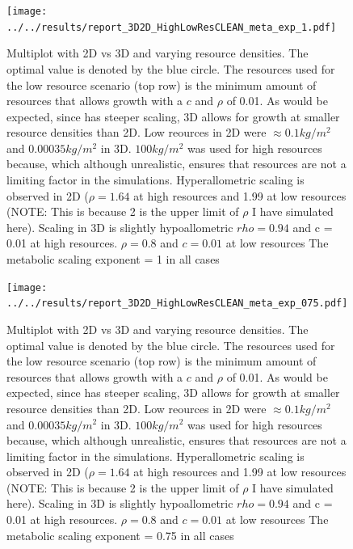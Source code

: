 \documentclass[a4paper, 11pt, hidelinks]{article} %
\begin{document}

	\begin{figure}[h!]
				
		\texttt{[image: ../../results/report\_3D2D\_HighLowResCLEAN\_meta\_exp\_1.pdf]}
		
		\caption{Multiplot with 2D vs 3D and varying resource densities. The optimal value is denoted by the blue circle.
		The resources used for the low resource scenario (top row) is the minimum amount of resources that allows growth with a $c$ and $\rho$ of 0.01.  As would be expected, since has steeper scaling, 3D allows for growth at smaller resource densities than 2D.
		Low reources in 2D were $ \approx 0.1kg/m^2 $ and $ 0.00035kg/m^2 $ in 3D.
		$ 100kg/m^2 $ was used for high resources because, which although unrealistic, ensures that resources are not a limiting factor in the simulations.
		Hyperallometric scaling is observed in 2D ($\rho = 1.64$ at high resources and 1.99 at low resources (NOTE: This is because 2 is the upper limit of $\rho$ I have simulated here). 
		Scaling in 3D is slightly hypoallometric $rho = 0.94$ and c = 0.01 at high resources. $\rho = 0.8$ and $c = 0.01$ at low resources
		The metabolic scaling exponent = 1 in all cases}
		\label{resources2D3D_meta_exp1}
	\end{figure}

	\begin{figure}[h!]
		
		\texttt{[image: ../../results/report\_3D2D\_HighLowResCLEAN\_meta\_exp\_075.pdf]}
		
		\caption{Multiplot with 2D vs 3D and varying resource densities. The optimal value is denoted by the blue circle.
			The resources used for the low resource scenario (top row) is the minimum amount of resources that allows growth with a $c$ and $\rho$ of 0.01.  As would be expected, since has steeper scaling, 3D allows for growth at smaller resource densities than 2D.
			Low reources in 2D were $ \approx 0.1kg/m^2 $ and $ 0.00035kg/m^2 $ in 3D.
			$ 100kg/m^2 $ was used for high resources because, which although unrealistic, ensures that resources are not a limiting factor in the simulations.
			Hyperallometric scaling is observed in 2D ($\rho = 1.64$ at high resources and 1.99 at low resources (NOTE: This is because 2 is the upper limit of $\rho$ I have simulated here). 
			Scaling in 3D is slightly hypoallometric $rho = 0.94$ and c = 0.01 at high resources. $\rho = 0.8$ and $c = 0.01$ at low resources
			The metabolic scaling exponent = 0.75 in all cases}
		\label{resources2D3D_meta_exp0.75}
	\end{figure}
	
\end{document}

